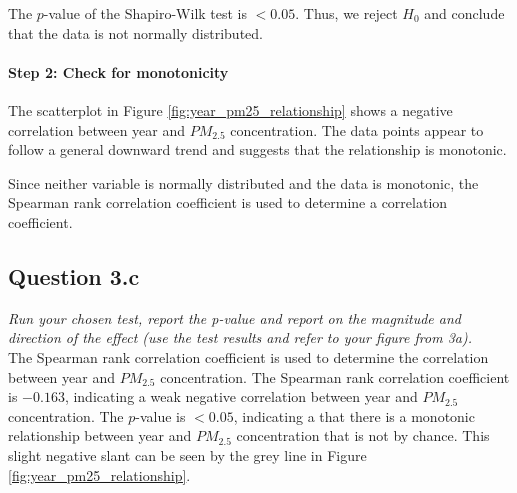 \noindent The $p$-value of the Shapiro-Wilk test is $< 0.05$. Thus, we reject $H_0$ and conclude that the data is not normally distributed.

\paragraph*{Step 2: Check for monotonicity}
The scatterplot in Figure \ref{fig:year_pm25_relationship} shows a negative correlation between year and $PM_{2.5}$ concentration. The data points appear to follow a general downward trend and suggests that the relationship is monotonic.

\noindent Since neither variable is normally distributed and the data is monotonic, the Spearman rank correlation coefficient is used to determine a correlation coefficient.


\subsection{Question 3.c}
\textit{Run your chosen test, report the p-value and report on the magnitude and
direction of the effect (use the test results and refer to your figure from 3a).}\\

\noindent The Spearman rank correlation coefficient is used to determine the correlation between year and $PM_{2.5}$ concentration. The Spearman rank correlation coefficient is $-0.163$, indicating a weak negative correlation between year and $PM_{2.5}$ concentration. The $p$-value is $< 0.05$, indicating a that there is a monotonic relationship between year and $PM_{2.5}$ concentration that is not by chance. This slight negative slant can be seen by the grey line in Figure \ref{fig:year_pm25_relationship}.\\



\newpage